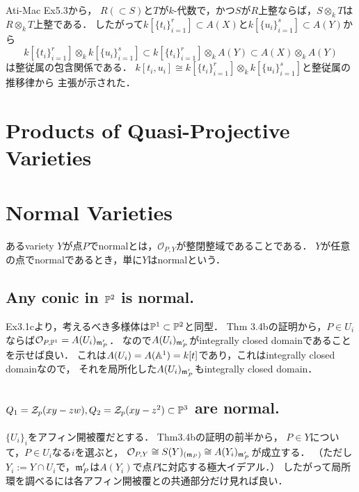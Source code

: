 \documentclass[a4paper]{jsarticle}
\begin{document}
    Ati-Mac Ex5.3から，
    $R (\subset S)$と$T$が$k$-代数で，かつ$S$が$R$上整ならば，$S \otimes_k T$は$R \otimes _k T$上整である．
    したがって$k[\{t_i\}_{i=1}^{r}] \subset A(X)$と$k[\{u_i\}_{i=1}^{s}] \subset A(Y)$から
    \[ k[\{t_i\}_{i=1}^{r}] \otimes_k k[\{u_i\}_{i=1}^{s}] \subset k[\{t_i\}_{i=1}^{r}] \otimes_k A(Y) \subset A(X) \otimes_k A(Y) \]
    は整従属の包含関係である．
    $k[t_i,u_i] \cong k[\{t_i\}_{i=1}^{r}] \otimes_k k[\{u_i\}_{i=1}^{s}]$と整従属の推移律から
    主張が示された．

\section{Products of Quasi-Projective Varieties} 

\section{Normal Varieties}
    あるvariety $Y$が点$P$でnormalとは，$\mathcal{O}_{P,Y}$が整閉整域であることである．
    $Y$が任意の点でnormalであるとき，単に$Y$はnormalという．

    \subsection{Any conic in $\mathbb{P}^2$ is normal.}
    Ex3.1cより，考えるべき多様体は$\mathbb{P}^1 \subset \mathbb{P}^2$と同型．
    Thm 3.4bの証明から，$P \in U_i$ならば$\mathcal{O}_{P,\mathbb{P}^1}=A(U_i)_{\mathfrak{m}'_P}$．
    なので$A(U_i)_{\mathfrak{m}'_P}$がintegrally closed domainであることを示せば良い．
    これは$A(U_i)=A(\mathbb{A}^1)=k[t]$であり，これはintegrally closed domainなので，
    それを局所化した$A(U_i)_{\mathfrak{m}'_P}$もintegrally closed domain．


    \subsection{$Q_1=\mathcal{Z}_p(xy-zw), Q_2=\mathcal{Z}_p(xy-z^2) \subset \mathbb{P}^3$ are normal.}
    $\{U_i\}_i$をアフィン開被覆だとする．
    Thm3.4bの証明の前半から，
    $P \in Y$について，$P \in U_i$なる$i$を選ぶと，
    $\mathcal{O}_{P,Y} \cong S(Y)_{(\mathfrak{m}_P)} \cong A(Y_i)_{\mathfrak{m}'_P}$が成立する．
    （ただし$Y_i:=Y \cap U_i$で，$\mathfrak{m}'_P$は$A(Y_i)$で点$P$に対応する極大イデアル．）
    したがって局所環を調べるには各アフィン開被覆との共通部分だけ見れば良い．
\end{document}
